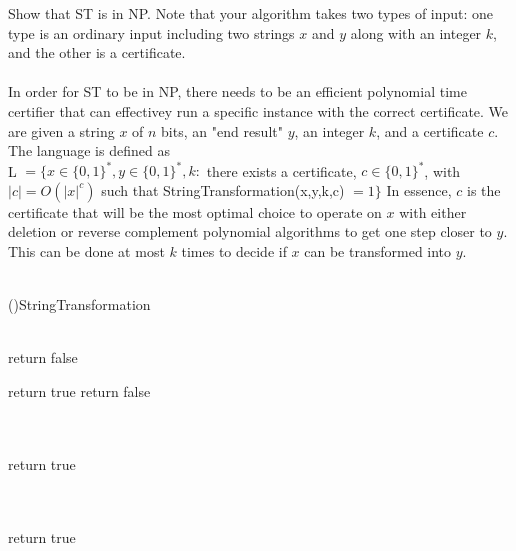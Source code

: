 \documentclass[11pt]{amsart}
\begin{document}
Show that ST is in NP. Note that your algorithm takes two types of input: one type is an ordinary input including two strings $x$ and $y$ along with an integer $k$, and the other is a certificate.\\
\newpage
\hrulefill \\
In order for ST to be in NP, there needs to be an efficient polynomial time certifier that can effectivey run a specific instance with the correct certificate. We are given a string $x$ of $n$ bits, an "end result" $y$, an integer $k$, and a certificate $c$. The language is defined as\\ L $= \{ x \in \{0,1\}^*, y \in \{0,1\}^*, k:$ there exists a certificate, $c \in \{0,1\}^*$, with $|c| = O(|x|^c)$ such that StringTransformation(x,y,k,c) $= 1 \}$ In essence, $c$ is the certificate that will be the most optimal choice to operate on $x$ with either deletion or reverse complement polynomial algorithms to get one step closer to $y$. This can be done at most $k$ times to decide if $x$ can be transformed into $y$.\\
\newpage
\hrulefill \\
\begin{algorithm}[H]
    \Fn(){StringTransformation}{
    \SetAlgoLined
    \SetNoFillComment
    \DontPrintSemicolon
        \\
         {
            return false
        }

         {
            return true
        }
         {
            return false
        }

        \\
         {
             {
                 {
                    \\
                     {
                        return true
                    }
                }
            }
        }

        \\
         {
             {
                \\
                 {
                    return true
                }
            }
        }
    }
    \end{algorithm}
\end{document}
